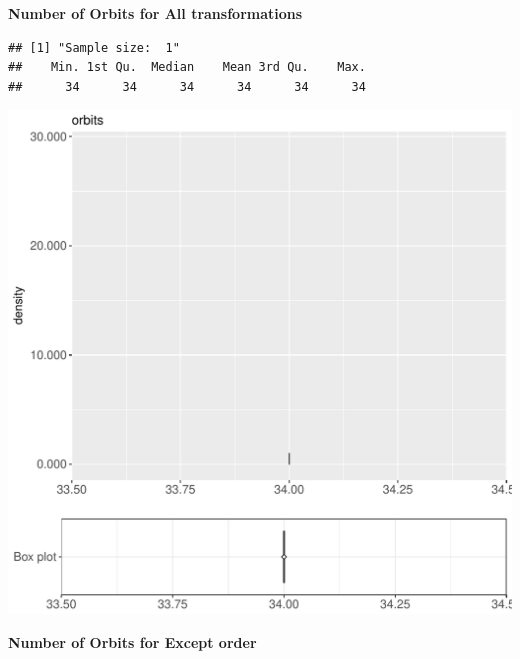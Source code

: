 \documentclass{article}\usepackage[]{graphicx}\usepackage[]{color}
\makeatletter
\def\maxwidth{ %
  \ifdim\Gin@nat@width>\linewidth
    \linewidth
  \else
    \Gin@nat@width
  \fi
}
\newenvironment{kframe}{%
 \def\at@end@of@kframe{}%
 \ifinner\ifhmode%
  \def\at@end@of@kframe{\end{minipage}}%
  \begin{minipage}{\columnwidth}%
 \fi\fi%
 \def\FrameCommand##1{\hskip\@totalleftmargin \hskip-\fboxsep
 \colorbox{shadecolor}{##1}\hskip-\fboxsep
     \hskip-\linewidth \hskip-\@totalleftmargin \hskip\columnwidth}%
 \MakeFramed {\advance\hsize-\width
   \@totalleftmargin\z@ \linewidth\hsize
   \@setminipage}}%
 {\par\unskip\endMakeFramed%
 \at@end@of@kframe}
\newenvironment{knitrout}{}{} %
\makeatother
\begin{document}
 \textbf{Number of Orbits for All transformations}
\begin{knitrout}
\color{fgcolor}\begin{kframe}
\begin{verbatim}
## [1] "Sample size:  1"
##    Min. 1st Qu.  Median    Mean 3rd Qu.    Max. 
##      34      34      34      34      34      34
\end{verbatim}


{\ttfamily\noindent\bfseries{}}\end{kframe}
\includegraphics[width=\maxwidth]{figure/RH5_cashew_big-1} 

\end{knitrout}
 \textbf{Number of Orbits for Except order}
\end{document}
